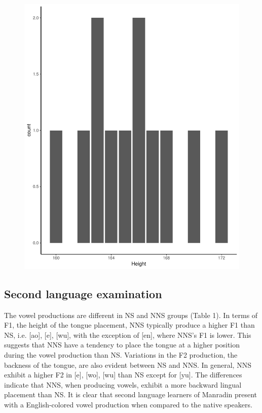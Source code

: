 \documentclass[man, fleqn, noextraspace]{apa6}
\begin{document}
\begin{figure}
\centering
\includegraphics{Vowel_v2_files/figure-latex/figure6-1.pdf}
\caption{}
\end{figure}

\subsection{Second language
examination}\label{second-language-examination}

The vowel productions are different in NS and NNS groups (Table 1). In
terms of F1, the height of the tongue placement, NNS typically produce a
higher F1 than NS, i.e. {[}ao{]}, {[}e{]}, {[}wu{]}, with the exception
of {[}en{]}, where NNS's F1 is lower. This suggests that NNS have a
tendency to place the tongue at a higher position during the vowel
production than NS. Variations in the F2 production, the backness of the
tongue, are also evident between NS and NNS. In general, NNS exhibit a
higher F2 in {[}e{]}, {[}wo{]}, {[}wu{]} than NS except for {[}yu{]}.
The differences indicate that NNS, when producing vowels, exhibit a more
backward lingual placement than NS. It is clear that second language
learners of Manradin present with a English-colored vowel production
when compared to the native speakers.
\end{document}
